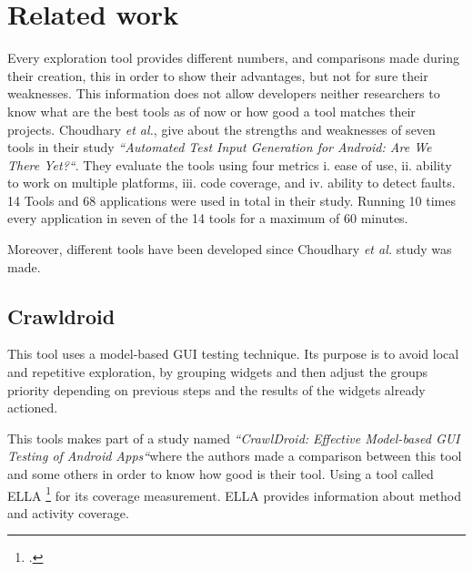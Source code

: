 
\chapter{Related work} %


\label{Chapter2} %


Every exploration tool provides different numbers, and comparisons made during their creation, this in order to show their advantages, but not for sure their weaknesses. This information does not allow developers neither researchers to know what are the best tools as of now or how good a tool matches their projects. 
Choudhary \textit{et al.},  give about the strengths and weaknesses of seven tools in their study \textit{``Automated Test Input Generation for Android: Are We There Yet?``}. They evaluate the tools using four metrics i. ease
of use, ii. ability to work on multiple platforms, iii. code coverage, and iv.
ability to detect faults. 14 Tools and 68 applications were used in total in their study. Running 10 times every application in seven of the 14 tools for a maximum of 60 minutes.

Moreover, different tools have been developed since Choudhary \textit{et al.}  study was made. 

\section{Crawldroid}\label{sec:crawldroid}

This tool uses a model-based GUI testing technique. Its purpose is to avoid local and repetitive exploration, by grouping widgets and then adjust the groups priority depending on previous steps and the results of the widgets already actioned. 

This tools makes part of a study named \textit{``CrawlDroid: Effective Model-based GUI Testing of Android Apps``}where the authors made a comparison between this tool and some others in order to know how good is their tool. Using a tool called ELLA \footcite{https://github.com/saswatanand/ella} for its coverage measurement. ELLA provides information about method and activity coverage.

